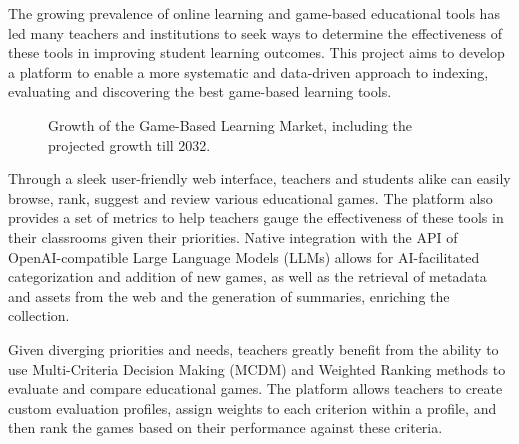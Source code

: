 \documentclass[11pt,italian,a4paper]{article}
\begin{document}
The growing prevalence of online learning and game-based educational tools has led many teachers and institutions to seek ways to determine the effectiveness of these tools in improving student learning outcomes. This project aims to develop a platform to enable a more systematic and data-driven approach to indexing, evaluating and discovering the best game-based learning tools.


\begin{figure}[h]
    \centering
    \caption{Growth of the Game-Based Learning Market, including the projected growth till 2032.}
\end{figure}

Through a sleek user-friendly web interface, teachers and students alike can easily browse, rank, suggest and review various educational games. The platform also provides a set of metrics to help teachers gauge the effectiveness of these tools in their classrooms given their priorities. Native integration with the API of OpenAI-compatible Large Language Models (LLMs) allows for AI-facilitated categorization and addition of new games, as well as the retrieval of metadata and assets from the web and the generation of summaries, enriching the collection.

Given diverging priorities and needs, teachers greatly benefit from the ability to use Multi-Criteria Decision Making (MCDM) and Weighted Ranking methods to evaluate and compare educational games. The platform allows teachers to create custom evaluation profiles, assign weights to each criterion within a profile, and then rank the games based on their performance against these criteria.
\end{document}
